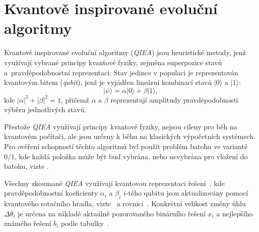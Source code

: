 \documentclass[czech]{ExcelAtFIT} %
\begin{document}
\section{Kvantově inspirované evoluční algoritmy}
\label{sec:qiea}

Kvantově inspirované evoluční algoritmy (\emph{QIEA}) jsou heuristické metody, jenž využívají vybrané principy kvantové fyziky, zejména superpozice stavů a~pravděpodobnostní reprezentaci. 
Stav jedince v populaci je reprezentován kvantovým bitem (\emph{qubit}), jenž je vyjádřen lineární kombinací stavů $| 0 \rangle$ a $| 1 \rangle$:
\begin{equation*}\label{eq:psi=a0+b1}
	| \psi \rangle = \alpha | 0 \rangle + \beta | 1 \rangle, 
\end{equation*}
kde ${\left| \alpha \right|}^2 + {\left| \beta \right|}^2 = 1$, přičemž $\alpha$ a $\beta$ reprezentují amplitudy pravděpodobnosti výběru jednotlivých stavů. 


Přestože \emph{QIEA} využívají principy kvantové fyziky, nej\-sou cíleny pro běh na kvantovém počítači, ale jsou určeny k běhu na klasických výpočetních systémech. 
Pro ověření schopností těchto algoritmů byl použit problém batohu ve variantě 0/1, kde každá položka může být buď vybrána, nebo nevybrána pro vložení do batohu, vizte .

Všechny zkoumané \emph{QIEA} využívají kvantovou reprezentaci řešení~, kde pravděpodobnostní koeficienty $\alpha_i$ a $\beta_i$ $i$-tého qubitu jsou aktualizovány pomocí kvantového rotačního hradla, vizte~ a rovnici~.
Konkrétní velikost změny úhlu $\Delta\theta_i$ je určena na základě aktuálně pozorovaného binárního řešení $x_i$ a nejlepšího známého řešení $b_i$ podle tabulky~.
\end{document}
